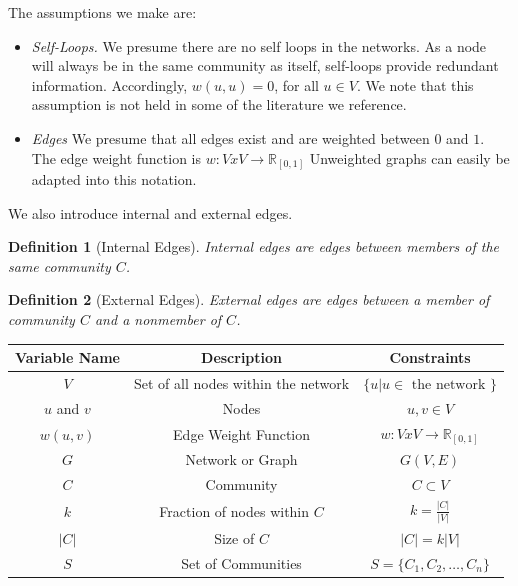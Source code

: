 \documentclass[phd,tocprelim]{cornell}
\newtheorem{definition}{Definition}
\renewcommand{\caption}[1]{\singlespacing\hangcaption{#1}\normalspacing}
\begin{document}
The assumptions we make are:
\begin{itemize}
\item {\it Self-Loops.}  We presume there are no self loops in the networks.  As a node will always be in the same community as itself, self-loops provide redundant information.  Accordingly, $w(u, u) = 0$, for all $u \in V$.  We note that this assumption is not held in some of the literature we reference.
\item {\it Edges} We presume that all edges exist and are weighted between $0$ and $1$.  The edge weight function is $w : VxV \rightarrow \mathbb{R}_{[0, 1]}$  Unweighted graphs can easily be adapted into this notation.
\end{itemize}

We also introduce internal and external edges.
\begin{definition}[Internal Edges]
Internal edges are edges between members of the same community $C$.
\end{definition}
\begin{definition}[External Edges]
External edges are edges between a member of community $C$ and a nonmember of $C$.
\end{definition}

\begin{table}
\caption{Notation}
\begin{center}
\begin{tabular}{|c|c|c|} \hline
Variable Name & Description & Constraints \\ \hline
$V$ & Set of all nodes within the network & $\{u | u \in \mbox{ the network }\}$\\ \hline
$u$ and $v$ & Nodes & $u, v \in V$ \\ \hline
$w(u,v)$ & Edge Weight Function &  $w:VxV \rightarrow \mathbb{R} _{[0, 1]}$ \\ \hline
$G$ & Network or Graph & $G(V,E)$ \\ \hline
$C$ & Community & $C \subset V$ \\ \hline
$k$ & Fraction of nodes within $C$ & $k = \frac{|C|}{|V|}$ \\ \hline
$|C|$ & Size of $C$ & $|C| = k|V |$ \\ \hline
$S$ & Set of Communities & $S = \{C_1,C_2,\dots,C_n\}$\\ \hline
\end{tabular}
\end{center}
\label{table_variables}
\end{table}
\end{document}
